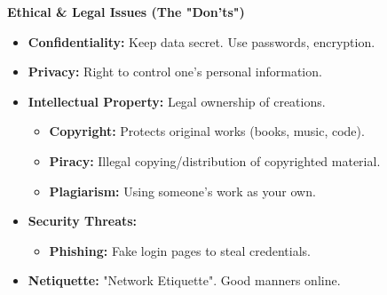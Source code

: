 \documentclass[a4paper, 8pt]{extarticle}
\newcommand{\subsectionheading}[1]{\normalsize\textbf{#1}}
\begin{document}
\begin{multicols}{2}
\subsectionheading{Ethical \& Legal Issues (The "Don'ts")}
\begin{itemize}
    \item \textbf{Confidentiality:} Keep data secret. Use passwords, encryption.
    \item \textbf{Privacy:} Right to control one's personal information.
    \item \textbf{Intellectual Property:} Legal ownership of creations.
        \begin{itemize}
            \item \textbf{Copyright:} Protects original works (books, music, code).
            \item \textbf{Piracy:} Illegal copying/distribution of copyrighted material.
            \item \textbf{Plagiarism:} Using someone's work as your own.
        \end{itemize}
    \item \textbf{Security Threats:}
        \begin{itemize}
            \item \textbf{Phishing:} Fake login pages to steal credentials.
        \end{itemize}
    \item \textbf{Netiquette:} "Network Etiquette". Good manners online.
\end{itemize}

\end{multicols}
\end{document}
